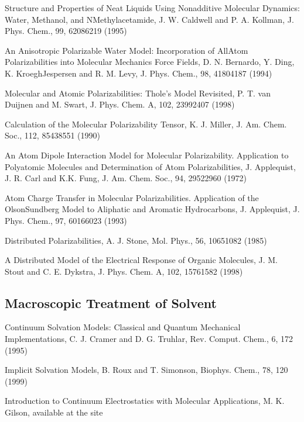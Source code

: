 \documentclass[letterpaper,11pt,english]{sphinxmanual}
\begin{document}
\sphinxAtStartPar
Structure and Properties of Neat Liquids Using Nonadditive Molecular Dynamics: Water, Methanol, and N\sphinxhyphen{}Methylacetamide, J. W. Caldwell and P. A. Kollman, J. Phys. Chem., 99, 6208\sphinxhyphen{}6219 (1995)

\sphinxAtStartPar
An Anisotropic Polarizable Water Model: Incorporation of All\sphinxhyphen{}Atom Polarizabilities into Molecular Mechanics Force Fields, D. N. Bernardo, Y. Ding, K. Kroegh\sphinxhyphen{}Jespersen and R. M. Levy, J. Phys. Chem., 98, 4180\sphinxhyphen{}4187 (1994)

\sphinxAtStartPar
Molecular and Atomic Polarizabilities: Thole’s Model Revisited, P. T. van Duijnen and M. Swart, J. Phys. Chem. A, 102, 2399\sphinxhyphen{}2407 (1998)

\sphinxAtStartPar
Calculation of the Molecular Polarizability Tensor, K. J. Miller, J. Am. Chem. Soc., 112, 8543\sphinxhyphen{}8551 (1990)

\sphinxAtStartPar
An Atom Dipole Interaction Model for Molecular Polarizability. Application to Polyatomic Molecules and Determination of Atom Polarizabilities, J. Applequist, J. R. Carl and K.\sphinxhyphen{}K. Fung, J. Am. Chem. Soc., 94, 2952\sphinxhyphen{}2960 (1972)

\sphinxAtStartPar
Atom Charge Transfer in Molecular Polarizabilities. Application of the Olson\sphinxhyphen{}Sundberg Model to Aliphatic and Aromatic Hydrocarbons, J. Applequist, J. Phys. Chem., 97, 6016\sphinxhyphen{}6023 (1993)

\sphinxAtStartPar
Distributed Polarizabilities, A. J. Stone, Mol. Phys., 56, 1065\sphinxhyphen{}1082 (1985)

\sphinxAtStartPar
A Distributed Model of the Electrical Response of Organic Molecules, J. M. Stout and C. E. Dykstra, J. Phys. Chem. A, 102, 1576\sphinxhyphen{}1582 (1998)


\subsection{Macroscopic Treatment of Solvent}
\label{\detokenize{text/references:macroscopic-treatment-of-solvent}}
\sphinxAtStartPar
Continuum Solvation Models: Classical and Quantum Mechanical Implementations, C. J. Cramer and D. G. Truhlar, Rev. Comput. Chem., 6, 1\sphinxhyphen{}72 (1995)

\sphinxAtStartPar
Implicit Solvation Models, B. Roux and T. Simonson, Biophys. Chem., 78, 1\sphinxhyphen{}20 (1999)

\sphinxAtStartPar
Introduction to Continuum Electrostatics with Molecular Applications, M. K. Gilson, available at the site 
\end{document}
